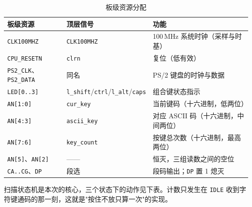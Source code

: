 \documentclass[12pt, a4paper]{ctexart}
\begin{document}
\begin{table}[htbp]
    \centering
    \caption{板级资源分配}
    \label{tab:io}
    \begin{tabular}{lll}
        \hline
        板级资源 & 顶层信号 & 功能 \\
        \hline
        \texttt{CLK100MHZ} & \texttt{CLK100MHZ} & 100\,MHz 系统时钟（采样与时基）\\
        \texttt{CPU\_RESETN} & \texttt{clrn} & 复位（低有效）\\
        \texttt{PS2\_CLK}、\texttt{PS2\_DATA} & 同名 & PS/2 键盘的时钟与数据 \\
        \texttt{LED[0..3]} & \texttt{l\_shift}/\texttt{ctrl}/\texttt{l\_alt}/\texttt{caps} & 组合键状态指示 \\
        \texttt{AN[1:0]} & \texttt{cur\_key} & 当前键码（十六进制，低两位）\\
        \texttt{AN[4:3]} & \texttt{ascii\_key} & 对应 ASCII 码（十六进制，中间两位）\\
        \texttt{AN[7:6]} & \texttt{key\_count} & 按键总次数（十六进制，最高两位）\\
        \texttt{AN[5]}、\texttt{AN[2]} & —— & 恒灭，三组读数之间的空位 \\
        \texttt{CA..CG}、\texttt{DP} & 段选 & 段码输出；\texttt{DP} 置 1 熄灭 \\
        \hline
    \end{tabular}
\end{table}

扫描状态机是本次的核心，三个状态下的动作见下表。计数只发生在 \texttt{IDLE} 收到字符键通码的那一刻，这就是"按住不放只算一次"的实现。
\end{document}
